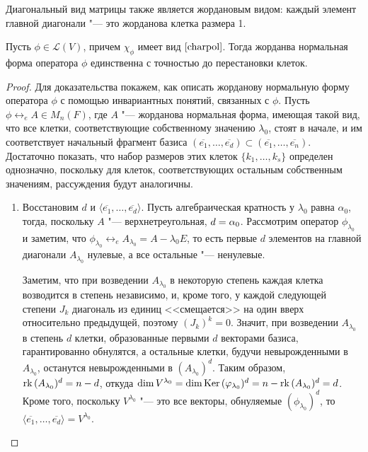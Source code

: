 \begin{note}
	Диагональный вид матрицы также является жордановым видом: каждый элемент главной диагонали "--- это жорданова клетка размера 1.
\end{note}

\begin{theorem}
	Пусть $\phi \in \mathcal{L}(V)$, причем $\chi_\phi$ имеет вид $\eqref*{charpol}$. Тогда жорданва нормальная форма оператора $\phi$ единственна с точностью до перестановки клеток.
\end{theorem}

\begin{proof}
	Для доказательства покажем, как описать жорданову нормальную форму оператора $\phi$ с помощью инвариантных понятий, связанных с $\phi$. Пусть $\phi \leftrightarrow_e A \in M_n(F)$, где $A$ "--- жорданова нормальная форма, имеющая такой вид, что все клетки, соответствующие собственному значению $\lambda_0$, стоят в начале, и им соответствует начальный фрагмент базиса $(\overline{e_1},\dots,\overline{e_d}) \subset (\overline{e_1},\dots,\overline{e_n})$. Достаточно показать, что набор размеров этих клеток $\{k_1, \dots, k_s\}$ определен однозначно, поскольку для клеток, соответствующих остальным собственным значениям, рассуждения будут аналогичны.
	
	\begin{enumerate}
		\item Восстановим $d$ и $\langle\overline{e_1}, \dots, \overline{e_d}\rangle$. Пусть алгебраическая кратность у $\lambda_0$ равна $\alpha_0$, тогда, поскольку $A$ "--- верхнетреугольная, $d \hm{=} \alpha_0$. Рассмотрим оператор $\phi_{\lambda_0}$ и заметим, что $\phi_{\lambda_0} \leftrightarrow_e A_{\lambda_0} = A -\lambda_0E$, то есть первые $d$ элементов на главной диагонали $A_{\lambda_0}$ нулевые, а все остальные "--- ненулевые.
		
		Заметим, что при возведении $A_{\lambda_0}$ в некоторую степень каждая клетка возводится в степень независимо, и, кроме того, у каждой следующей степени $J_k$ диагональ из единиц <<смещается>> на один вверх относительно предыдущей, поэтому $(J_k)^k = 0$. Значит, при возведении $A_{\lambda_0}$ в степень $d$ клетки, образованные первыми $d$ векторами базиса, гарантированно обнулятся, а остальные клетки, будучи невырожденными в $A_{\lambda_0}$, останутся невырожденными в $(A_{\lambda_0})^d$. Таким образом, $\operatorname{rk}{(A_{\lambda_0})^d} = n - d$, откуда $\dim{V^{\lambda_0}} = \dim{\operatorname{Ker}{(\ensuremath{\varphi}_{\lambda_0})^d}} = n - \operatorname{rk}{(A_{\lambda_0})^d} = d$. Кроме того, поскольку $V^{\lambda_0}$ "--- это все векторы, обнуляемые $(\phi_{\lambda_0})^d$, то $\langle\overline{e_1}, \dots, \overline{e_d}\rangle = V^{\lambda_0}$.
		

\end{enumerate}
\end{proof}
